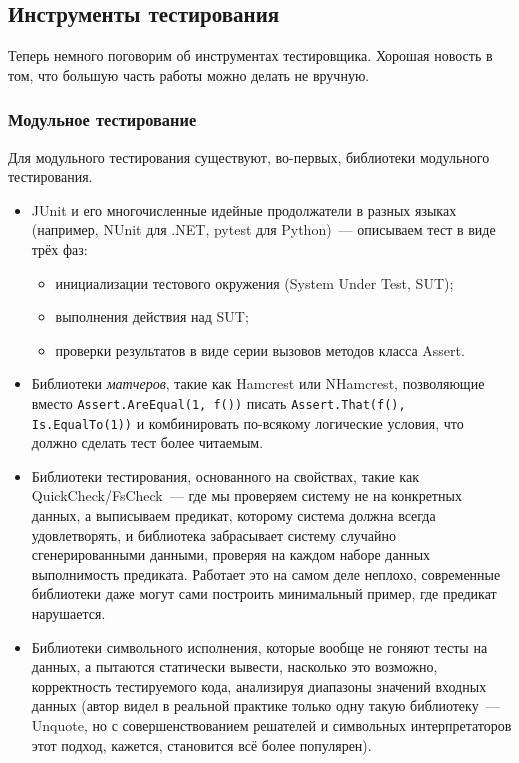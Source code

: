 \documentclass{../../text-style}
\begin{document}
\subsection{Инструменты тестирования}

Теперь немного поговорим об инструментах тестировщика. Хорошая новость в том, что большую часть работы можно делать не вручную.

\subsubsection{Модульное тестирование}

Для модульного тестирования существуют, во-первых, библиотеки модульного тестирования.

\begin{itemize}
    \item JUnit и его многочисленные идейные продолжатели в разных языках (например, NUnit для .NET, pytest для Python)~--- описываем тест в виде трёх фаз:
    \begin{itemize}
        \item инициализации тестового окружения (System Under Test, SUT);
        \item выполнения действия над SUT;
        \item проверки результатов в виде серии вызовов методов класса Assert.
    \end{itemize}
    \item Библиотеки \emph{матчеров}, такие как Hamcrest или NHamcrest, позволяющие вместо \texttt{Assert.AreEqual(1, f())} писать \texttt{Assert.That(f(), Is.EqualTo(1))} и комбинировать по-всякому логические условия, что должно сделать тест более читаемым.
    \item Библиотеки тестирования, основанного на свойствах, такие как QuickCheck/FsCheck~--- где мы проверяем систему не на конкретных данных, а выписываем предикат, которому система должна всегда удовлетворять, и библиотека забрасывает систему случайно сгенерированными данными, проверяя на каждом наборе данных выполнимость предиката. Работает это на самом деле неплохо, современные библиотеки даже могут сами построить минимальный пример, где предикат нарушается.
    \item Библиотеки символьного исполнения, которые вообще не гоняют тесты на данных, а пытаются статически вывести, насколько это возможно, корректность тестируемого кода, анализируя диапазоны значений входных данных (автор видел в реальной практике только одну такую библиотеку~--- Unquote, но с совершенствованием решателей и символьных интерпретаторов этот подход, кажется, становится всё более популярен).
\end{itemize}
\end{document}
